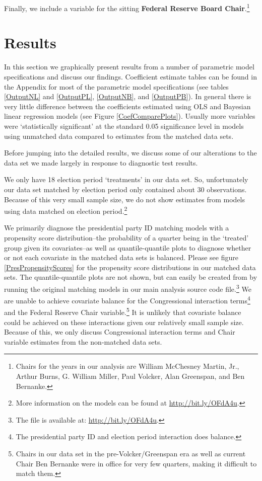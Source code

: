 \documentclass[a4paper]{article}
\begin{document}
Finally, we include a variable for the sitting {\bf{Federal Reserve Board Chair}}.\footnote{Chairs for the years in our analysis are William McChesney Martin, Jr., Arthur Burns, G. William Miller, Paul Volcker, Alan Greenspan, and Ben Bernanke.}

\section{Results}

In this section we graphically present results from a number of parametric model specifications and discuss our findings. Coefficient estimate tables can be found in the Appendix for most of the parametric model specifications (see tables \ref{OutputNL} and \ref{OutputPL}, \ref{OutputNB}, and \ref{OutputPB}). In general there is very little difference between the coefficients estimated using OLS and Bayesian linear regression models (see Figure \ref{CoefComparePlots}). Usually more variables were `statistically significant' at the standard 0.05 significance level in models using unmatched data compared to estimates from the matched data sets. 

Before jumping into the detailed results, we discuss some of our alterations to the data set we made largely in response to diagnostic test results. 

We only have 18 election period `treatments' in our data set. So, unfortunately our data set matched by election period only contained about 30 observations. Because of this very small sample size, we do not show estimates from models using data matched on election period.\footnote{More information on the models can be found at \url{http://bit.ly/OFdA4u}.}

We primarily diagnose the presidential party ID matching models with a propensity score distribution--the probability of a quarter being in the `treated' group given its covariates--as well as quantile-quantile plots \citep{Ho2007} to diagnose whether or not each covariate in the matched data sets is balanced. Please see figure \ref{PresPropensityScores} for the propensity score distributions in our matched data sets. The quantile-quantile plots are not shown, but can easily be created from by running the original matching models in our main analysis source code file.\footnote{The file is available at: \url{http://bit.ly/OFdA4u}.}  We are unable to achieve covariate balance for the Congressional interaction terms\footnote{The presidential party ID and election period interaction does balance.} and the Federal Reserve Chair variable.\footnote{Chairs in our data set in the pre-Volcker/Greenspan era as well as current Chair Ben Bernanke were in office for very few quarters, making it difficult to match them.} It is unlikely that  covariate balance could be achieved on these interactions given our relatively small sample size. Because of this, we only discuss Congressional interaction terms and Chair variable estimates from the non-matched data sets.
\end{document}
